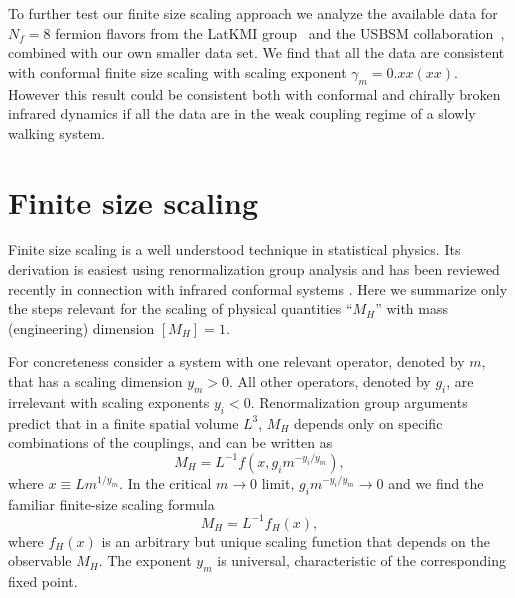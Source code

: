 \documentclass[aps,prl,twocolumn,]{revtex4}  %
\begin{document}
To further test our finite size scaling approach we analyze the available data for $N_f=8$ fermion flavors  from the LatKMI group~\cite{Aoki:2013xza} and  the USBSM collaboration~\cite{Schaich:2013eba}, combined with our own smaller data set. We find that all the data are consistent with  conformal finite size scaling  with scaling exponent $\gamma_m=0.xx(xx)$. However this result could be consistent both with conformal and  chirally broken infrared dynamics if all the data are in the  weak coupling regime of a slowly walking system.




\section{Finite size scaling}
Finite size scaling is a well understood technique in statistical physics.
Its derivation is easiest using renormalization group analysis and has been reviewed recently in connection with infrared conformal systems \cite{DeGrand:2009mt, DelDebbio:2010ze,DelDebbio:2013qta}.
Here we summarize only the steps relevant for the scaling of physical quantities ``$M_H$'' with mass (engineering) dimension $[M_H] = 1$.

For concreteness consider a system with one relevant operator, denoted by $m$, that has a scaling dimension $y_m > 0$.
All other operators, denoted by $g_i$, are irrelevant with scaling exponents $y_i < 0$.
Renormalization group arguments predict that in a finite spatial volume $L^3$, $M_H$ depends only on specific combinations of the couplings, and can be written as
\begin{equation}
  \label{eq:general}
  M_H = L^{-1} f\left(x, g_i m^{-y_i / y_m}\right),
\end{equation}
where $x \equiv L m^{1 / y_m}$.
In the critical $m\to 0$ limit, $g_i m^{-y_i / y_m} \to 0$ and we find the familiar finite-size scaling formula
\begin{equation}
\label{eq:leading_fss}
  M_H = L^{-1} f_H(x),
\end{equation}
where $f_H(x)$ is an arbitrary but unique scaling function that
depends on the observable $M_H$. The exponent $y_m$  is universal, characteristic of the corresponding fixed point.
\end{document}
